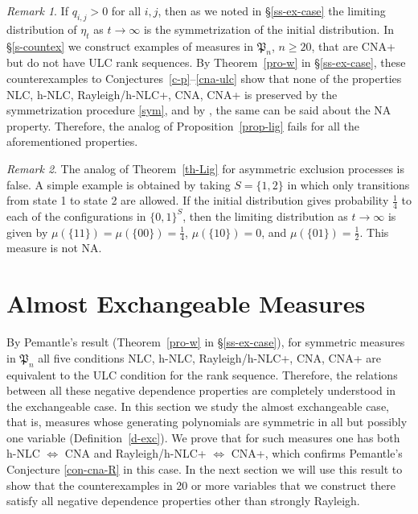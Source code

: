 \documentclass[10pt,reqno]{amsart}
\theoremstyle{plain}
\theoremstyle{definition}
\theoremstyle{remark}
\newtheorem{remark}{Remark}[section]
\newcommand{\fP}{\mathfrak{P}}
\begin{document}
\begin{remark}\label{r-lig-21}
If $q_{i,j}>0$ for all $i,j$, then as we noted in \S \ref{ss-ex-case} 
the limiting distribution of $\eta_t$ as
$t\to\infty$ is the symmetrization of the initial distribution. In 
\S \ref{s-countex} we construct examples of measures in $\fP_{n}$, 
$n\ge 20$, that are CNA+ but do
not have ULC rank sequences. By Theorem~\ref{pro-w} in \S \ref{ss-ex-case}, 
these counterexamples
to Conjectures~\ref{c-p}--\ref{cna-ulc} show that none of 
the properties NLC, h-NLC, Rayleigh/h-NLC+, CNA, CNA+ is preserved by the
symmetrization procedure \eqref{sym}, and by \cite[Theorem 3.2]{L2}, the same
can be said about the NA property. Therefore, the analog of 
Proposition~\ref{prop-lig} fails for all the aforementioned properties.
\end{remark}

\begin{remark}\label{r-lig-2}
The analog of Theorem~\ref{th-Lig} for asymmetric exclusion processes is 
false. A simple example is
obtained by taking $S=\{1,2\}$ in which only transitions from state 1 to 
state  2 are allowed. If the initial
distribution gives probability $\frac 14$ to each of the configurations in
$\{0,1\}^S$, then
the limiting distribution as $t\to\infty$ is given by 
$\mu(\{11\})=\mu(\{00\})=\frac14$,
$\mu(\{10\})=0$, and $\mu(\{01\})=\frac 12$. This measure is not NA.
\end{remark}

\section{Almost Exchangeable Measures}\label{Almost}

By Pemantle's result (Theorem~\ref{pro-w} in \S \ref{ss-ex-case}), for 
symmetric measures in $\fP_n$ all five conditions NLC, h-NLC, 
Rayleigh/h-NLC+, CNA, CNA+ are equivalent to the ULC condition for the rank 
sequence. Therefore, the relations between 
all these negative dependence properties are completely understood in the 
exchangeable case. In this section we study the almost exchangeable
case, that is, measures whose generating polynomials are 
symmetric in all but possibly one variable (Definition~\ref{d-exc}). We prove 
that for such measures one has both 
h-NLC $\Leftrightarrow$ CNA and 
Rayleigh/h-NLC+ $\Leftrightarrow$ CNA+, which confirms 
Pemantle's Conjecture \ref{con-cna-R} in this case. In the next section we 
will use this result to show that the counterexamples in 20 or more 
variables  that we 
construct there satisfy 
all negative dependence properties other than strongly Rayleigh.
\end{document}
